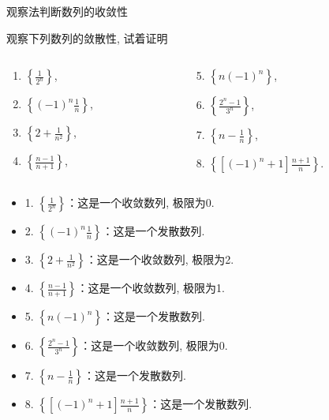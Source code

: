 \documentclass[
10pt,
aspectratio=43,
]{beamer}
\begin{document}
\begin{frame}{观察法判断数列的收敛性}
	\begin{block}{观察下列数列的敛散性, 试着证明}
		\begin{columns}[onlytextwidth]
			\begin{column}{0.5\textwidth}
				\begin{enumerate}
					\item $\left\{\frac{1}{2^n}\right\}$,
					\item $\left\{(-1)^n \frac{1}{n}\right\}$,
					\item $\left\{2+\frac{1}{n^2}\right\}$,
					\item $\left\{\frac{n-1}{n+1}\right\}$,
				\end{enumerate}
			\end{column}
			\begin{column}{0.5\textwidth}
				\begin{enumerate}
					\setcounter{enumi}{4}
					\item $\left\{n(-1)^n\right\}$,
					\item $\left\{\frac{2^n-1}{3^n}\right\}$,
					\item $\left\{n-\frac{1}{n}\right\}$,
					\item $\left\{\left[(-1)^n+1\right] \frac{n+1}{n}\right\}$.
				\end{enumerate}
			\end{column}
		\end{columns}
	\end{block}

	\pause

	\begin{itemize}
		\item 1. $\left\{\frac{1}{2^n}\right\}$：这是一个收敛数列, 极限为0.
		      \pause
		\item 2. $\left\{(-1)^n \frac{1}{n}\right\}$：这是一个发散数列.
		      \pause
		\item 3. $\left\{2+\frac{1}{n^2}\right\}$：这是一个收敛数列, 极限为2.
		      \pause
		\item 4. $\left\{\frac{n-1}{n+1}\right\}$：这是一个收敛数列, 极限为1.
		      \pause
		\item 5. $\left\{n(-1)^n\right\}$：这是一个发散数列.
		      \pause
		\item 6. $\left\{\frac{2^n-1}{3^n}\right\}$：这是一个收敛数列, 极限为0.
		      \pause
		\item 7. $\left\{n-\frac{1}{n}\right\}$：这是一个发散数列.
		      \pause
		\item 8. $\left\{\left[(-1)^n+1\right] \frac{n+1}{n}\right\}$：这是一个发散数列.
	\end{itemize}
\end{frame}
\end{document}
